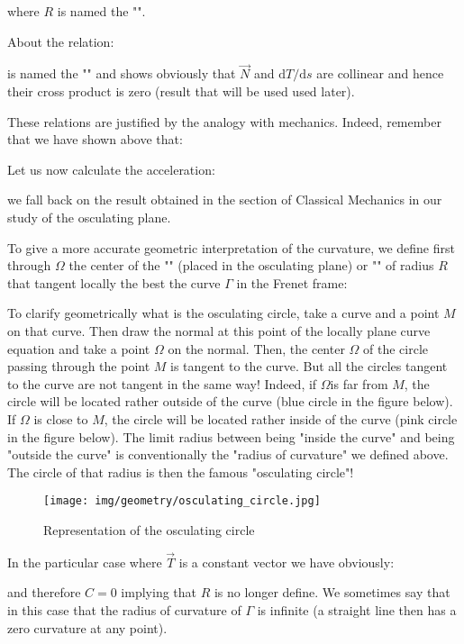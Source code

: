 {	where $R$ is named the "".
	
	About the relation:
	
	is named the "" and shows obviously that $\vec{N}$ and $\mathrm{d}T/\mathrm{d}s$ are collinear and hence their cross product is zero (result that will be used used later).
	
	These relations are justified by the analogy with mechanics. Indeed, remember that we have shown above that:
	
	
	Let us now calculate the acceleration:
	
	we fall back on the result obtained in the section of Classical Mechanics in our study of the osculating plane.
	
	To give a more accurate geometric interpretation of the curvature, we define first through $\Omega$ the center of the "" (placed in the osculating plane) or "" of radius $R$ that tangent locally the best the curve $\Gamma$ in the Frenet frame:
	
	To clarify geometrically what is the osculating circle, take a curve and a point $M$ on that curve. Then draw the normal at this point of the locally plane curve equation and take a point $\Omega$ on the normal. Then, the center $\Omega$ of the circle passing through the point $M$ is tangent to the curve. But all the circles tangent to the curve are not tangent in the same way! Indeed, if $\Omega $is far from $M$, the circle will be located rather outside of the curve (blue circle in the figure below). If $\Omega$ is close to $M$, the circle will be located rather inside of the curve (pink circle in the figure below). The limit radius between being "inside the curve" and being "outside the curve" is conventionally the "radius of curvature" we defined above. The circle of that radius is then the famous "osculating circle"!
	\begin{figure}[H]
		\centering
		\texttt{[image: img/geometry/osculating\_circle.jpg]}
		\caption{Representation of the osculating circle}
	\end{figure}
	In the particular case where $\vec{T}$ is a constant vector we have obviously:
	
	and therefore $C=0$ implying that $R$ is no longer define. We sometimes say that in this case that the radius of curvature  of $\Gamma$ is infinite (a straight line then has a zero curvature at any point).
	
}
